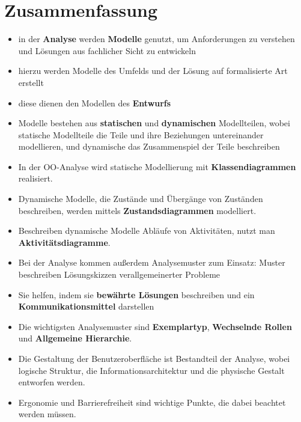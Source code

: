 \section{Zusammenfassung}


\begin{itemize}
    \item in der \textbf{Analyse} werden \textbf{Modelle} genutzt, um Anforderungen zu verstehen und Lösungen aus fachlicher Sicht zu entwickeln
    \item hierzu werden Modelle des Umfelds und der Lösung auf formalisierte Art erstellt
    \item diese dienen den Modellen des \textbf{Entwurfs}
    \item Modelle bestehen aus \textbf{statischen} und \textbf{dynamischen} Modellteilen, wobei statische Modellteile die Teile und ihre Beziehungen untereinander modellieren, und dynamische das Zusammenspiel der Teile beschreiben
    \item In der OO-Analyse wird statische Modellierung mit \textbf{Klassendiagrammen} realisiert.
    \item[] Dynamische Modelle, die Zustände und Übergänge von Zuständen beschreiben, werden mittels \textbf{Zustandsdiagrammen} modelliert.
    \item[] Beschreiben dynamische Modelle Abläufe von Aktivitäten, nutzt man \textbf{Aktivitätsdiagramme}.
    \item Bei der Analyse kommen außerdem Analysemuster zum Einsatz: Muster beschreiben Lösungskizzen verallgemeinerter Probleme
    \item[] Sie helfen, indem sie \textbf{bewährte Lösungen} beschreiben und ein \textbf{Kommunikationsmittel} darstellen
    \item Die wichtigsten Analysemuster sind \textbf{Exemplartyp}, \textbf{Wechselnde Rollen} und \textbf{Allgemeine Hierarchie}.
    \item Die Gestaltung der Benutzeroberfläche ist Bestandteil der Analyse, wobei logische Struktur, die Informationsarchitektur und die physische Gestalt entworfen werden.
    \item[] Ergonomie und Barrierefreiheit sind wichtige Punkte, die dabei beachtet werden müssen.
\end{itemize}